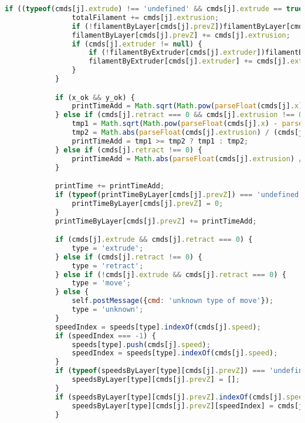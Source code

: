 \begin{lstlisting}[language=JavaScript, label={lst:Worker}, caption=Workerjs is the core gcode to D3 line processor.]
            if ((typeof(cmds[j].extrude) !== 'undefined' && cmds[j].extrude == true) || cmds[j].retract != 0) {
                totalFilament += cmds[j].extrusion;
                if (!filamentByLayer[cmds[j].prevZ])filamentByLayer[cmds[j].prevZ] = 0;
                filamentByLayer[cmds[j].prevZ] += cmds[j].extrusion;
                if (cmds[j].extruder != null) {
                    if (!filamentByExtruder[cmds[j].extruder])filamentByExtruder[cmds[j].extruder] = 0;
                    filamentByExtruder[cmds[j].extruder] += cmds[j].extrusion;
                }
            }

            if (x_ok && y_ok) {
                printTimeAdd = Math.sqrt(Math.pow(parseFloat(cmds[j].x) - parseFloat(cmds[j].prevX), 2) + Math.pow(parseFloat(cmds[j].y) - parseFloat(cmds[j].prevY), 2)) / (cmds[j].speed / 60);
            } else if (cmds[j].retract === 0 && cmds[j].extrusion !== 0) {
                tmp1 = Math.sqrt(Math.pow(parseFloat(cmds[j].x) - parseFloat(cmds[j].prevX), 2) + Math.pow(parseFloat(cmds[j].y) - parseFloat(cmds[j].prevY), 2)) / (cmds[j].speed / 60);
                tmp2 = Math.abs(parseFloat(cmds[j].extrusion) / (cmds[j].speed / 60));
                printTimeAdd = tmp1 >= tmp2 ? tmp1 : tmp2;
            } else if (cmds[j].retract !== 0) {
                printTimeAdd = Math.abs(parseFloat(cmds[j].extrusion) / (cmds[j].speed / 60));
            }

            printTime += printTimeAdd;
            if (typeof(printTimeByLayer[cmds[j].prevZ]) === 'undefined') {
                printTimeByLayer[cmds[j].prevZ] = 0;
            }
            printTimeByLayer[cmds[j].prevZ] += printTimeAdd;

            if (cmds[j].extrude && cmds[j].retract === 0) {
                type = 'extrude';
            } else if (cmds[j].retract !== 0) {
                type = 'retract';
            } else if (!cmds[j].extrude && cmds[j].retract === 0) {
                type = 'move';
            } else {
                self.postMessage({cmd: 'unknown type of move'});
                type = 'unknown';
            }
            speedIndex = speeds[type].indexOf(cmds[j].speed);
            if (speedIndex === -1) {
                speeds[type].push(cmds[j].speed);
                speedIndex = speeds[type].indexOf(cmds[j].speed);
            }
            if (typeof(speedsByLayer[type][cmds[j].prevZ]) === 'undefined') {
                speedsByLayer[type][cmds[j].prevZ] = [];
            }
            if (speedsByLayer[type][cmds[j].prevZ].indexOf(cmds[j].speed) === -1) {
                speedsByLayer[type][cmds[j].prevZ][speedIndex] = cmds[j].speed;
            }


\end{lstlisting}
